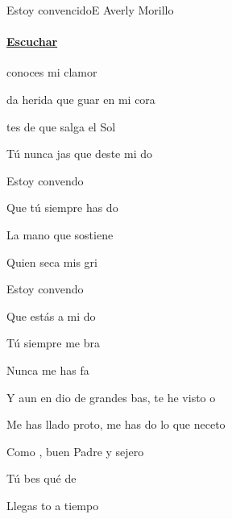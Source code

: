\documentclass[12pt, spanish]{book}
\newcommand{\NotCCLIed}{\relax}
\begin{document}
    \begin{song}{Estoy convencido}{E}
    {} %
    {Averly Morillo}
    {} %
    {} %
        \ifChordBk
        \paragraph{\mbox{}\hfill\protect\href{https://open.spotify.com/intl-es/track/4C9KXQuLIA7snKaZQgqnou}{Escuchar}\mbox{}\hfill}
        \fi



        \begin{SBOpGroup}
             conoces mi clamor

            da herida que guar en mi cora

            tes de que salga el Sol

            Tú nunca jas que deste mi do
        \end{SBOpGroup}

        \begin{SBChorus}
            Estoy convendo

            Que tú siempre has do

            La mano que  sostiene

            Quien seca mis gri

            Estoy convendo

            Que estás a mi do

            Tú siempre me bra

            Nunca me has fa

            Y aun en dio de  grandes bas, te he visto o

            Me has llado proto, me has do lo que neceto

            Como , buen Padre y sejero

            Tú bes qué de

            Llegas to a tiempo


\end{SBChorus}
\end{song}
\end{document}
